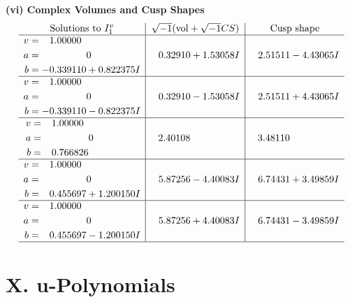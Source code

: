 \documentclass[1p]{elsarticle_modified}
\theoremstyle{definition}
\newcommand{\I}{\sqrt{-1}}
\begin{document}
\newpage\flushleft \textbf{(vi) Complex Volumes and Cusp Shapes}
$$\begin{array}{c|c|c}  
\text{Solutions to }I^v_{1}& \I (\text{vol} + \sqrt{-1}CS) & \text{Cusp shape}\\
 \hline 
\begin{aligned}
v &= \phantom{-}1.00000\phantom{ +0.000000I} \\
a &= \phantom{-0.000000 } 0 \\
b &= -0.339110 + 0.822375 I\end{aligned}
 & \phantom{-}0.32910 + 1.53058 I & \phantom{-}2.51511 - 4.43065 I \\ \hline\begin{aligned}
v &= \phantom{-}1.00000\phantom{ +0.000000I} \\
a &= \phantom{-0.000000 } 0 \\
b &= -0.339110 - 0.822375 I\end{aligned}
 & \phantom{-}0.32910 - 1.53058 I & \phantom{-}2.51511 + 4.43065 I \\ \hline\begin{aligned}
v &= \phantom{-}1.00000\phantom{ +0.000000I} \\
a &= \phantom{-0.000000 } 0 \\
b &= \phantom{-}0.766826\phantom{ +0.000000I}\end{aligned}
 & \phantom{-}2.40108\phantom{ +0.000000I} & \phantom{-}3.48110\phantom{ +0.000000I} \\ \hline\begin{aligned}
v &= \phantom{-}1.00000\phantom{ +0.000000I} \\
a &= \phantom{-0.000000 } 0 \\
b &= \phantom{-}0.455697 + 1.200150 I\end{aligned}
 & \phantom{-}5.87256 - 4.40083 I & \phantom{-}6.74431 + 3.49859 I \\ \hline\begin{aligned}
v &= \phantom{-}1.00000\phantom{ +0.000000I} \\
a &= \phantom{-0.000000 } 0 \\
b &= \phantom{-}0.455697 - 1.200150 I\end{aligned}
 & \phantom{-}5.87256 + 4.40083 I & \phantom{-}6.74431 - 3.49859 I\\
 \hline 
 \end{array}$$\newpage
\newpage\renewcommand{\arraystretch}{1}
\centering \section*{ X. u-Polynomials}
\end{document}
